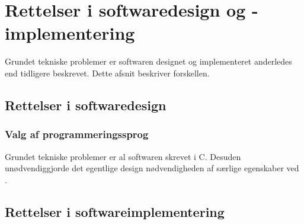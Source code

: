 \chapter{Rettelser i softwaredesign og -implementering}


Grundet tekniske problemer er softwaren designet og implementeret
anderledes end tidligere beskrevet. Dette afsnit beskriver forskellen.

\section{Rettelser i softwaredesign}

\subsection{Valg af programmeringssprog}
\label{sec:bilag-programmeringssprog}

Grundet tekniske problemer er al softwaren skrevet i C. Desuden
unødvendiggjorde det egentlige design nødvendigheden af særlige
egenskaber ved \Cpp .

\section{Rettelser i softwareimplementering}


